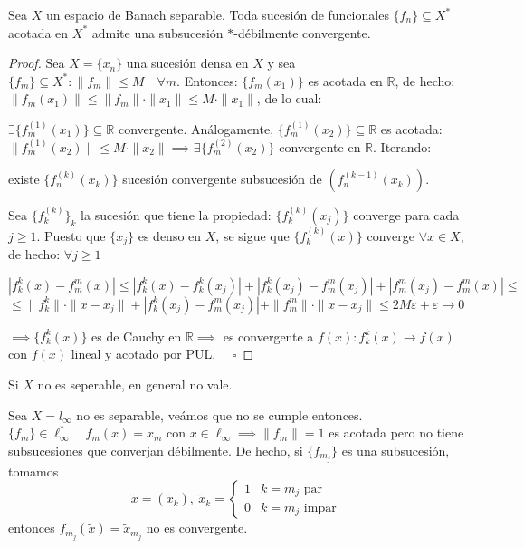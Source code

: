 \begin{teo}
    Sea $X$ un espacio de Banach separable. Toda sucesión de funcionales $\{f_n\} \subseteq X^*$ acotada en $X^*$ admite una subsucesión $*$-débilmente convergente.
\begin{proof}
    Sea $X = \{x_n\}$ una sucesión densa en $X$ y sea $\{f_m\} \subseteq X^* : \|f_m\| \le M \quad \forall m$. Entonces:
    $\{f_m(x_1)\}$ es acotada en $\mathbb{R}$, de hecho: $\|f_m(x_1)\| \le \|f_m\| \cdot \|x_1\| \le M \cdot \|x_1\|$, de lo cual:

    $\exists \{f_m^{(1)}(x_1)\} \subseteq \mathbb{R}$ convergente. Análogamente, $\{f_m^{(1)}(x_2)\} \subseteq \mathbb{R}$ es acotada:
    $\|f_m^{(1)}(x_2)\| \le M \cdot \|x_2\| \implies \exists \{f_m^{(2)}(x_2)\}$ convergente en $\mathbb{R}$. Iterando:

    existe $\{f_n^{(k)}(x_k)\}$ sucesión convergente subsucesión de $(f_n^{(k-1)}(x_k))$.

    Sea $\{f_k^{(k)}\}_k$ la sucesión que tiene la propiedad: $\{f_k^{(k)}(x_j)\}$ converge para cada $j \ge 1$.
    Puesto que $\{x_j\}$ es denso en $X$, se sigue que $\{f_k^{(k)}(x)\}$ converge $\forall x \in X$, de hecho: $\forall j \ge 1$

    \vspace{1em}
    $|f_k^k(x) - f_m^m(x)| \le |f_k^k(x) - f_k^k(x_j)| + |f_k^k(x_j) - f_m^m(x_j)| + |f_m^m(x_j) - f_m^m(x)| \le$
    \[ \le \|f_k^k\| \cdot \|x - x_j\| + |f_k^k(x_j) - f_m^m(x_j)| + \|f_m^m\| \cdot \|x - x_j\| \le 2M\varepsilon + \varepsilon \longrightarrow 0 \]

    $\implies \{f_k^k(x)\}$ es de Cauchy en $\mathbb{R} \implies$ es convergente a $f(x) : f_k^k(x) \longrightarrow f(x)$ con $f(x)$ lineal y acotado por PUL. $\quad \square$

\end{proof}
\end{teo}

\begin{observacion}
    Si $X$ no es seperable, en general no vale.
\end{observacion}

\begin{ejemplo}
    Sea $X=l_\infty$ no es separable, veámos que no se cumple entonces. \\
    \noindent
    $\{f_m\} \in \ell_\infty^* \quad f_m(x) = x_m$ con $x \in \ell_\infty \implies \|f_m\| = 1$ es acotada pero no tiene subsucesiones que converjan débilmente. De hecho, si $\{f_{m_j}\}$ es una subsucesión, tomamos 
    $$\tilde{x} = (\tilde{x}_k), \ \tilde{x}_k = \begin{cases} 1 & k = m_j \text{ par} \\ 0 & k = m_j \text{ impar} \end{cases}$$
    entonces $f_{m_j}(\tilde{x}) = \tilde{x}_{m_j}$ no es convergente.
\end{ejemplo}

